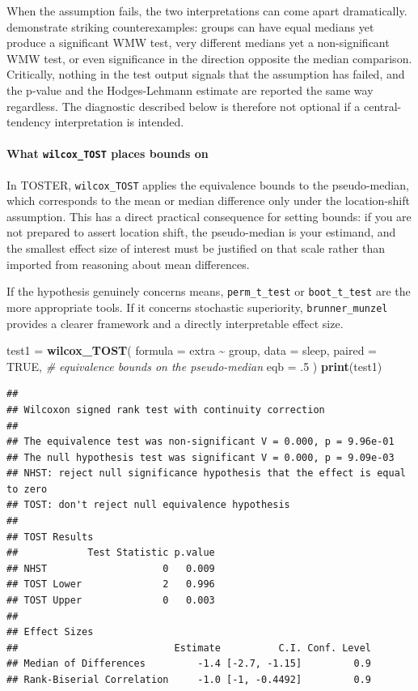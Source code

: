 \documentclass[]{interact}
\theoremstyle{plain}%
\theoremstyle{definition}
\theoremstyle{remark}
\newenvironment{Shaded}{\begin{snugshade}}{\end{snugshade}}
\newcommand{\AttributeTok}[1]{\textcolor[rgb]{0.13,0.29,0.53}{#1}}
\newcommand{\CommentTok}[1]{\textcolor[rgb]{0.56,0.35,0.01}{\textit{#1}}}
\newcommand{\ConstantTok}[1]{\textcolor[rgb]{0.56,0.35,0.01}{#1}}
\newcommand{\DecValTok}[1]{\textcolor[rgb]{0.00,0.00,0.81}{#1}}
\newcommand{\FunctionTok}[1]{\textcolor[rgb]{0.13,0.29,0.53}{\textbf{#1}}}
\newcommand{\NormalTok}[1]{#1}
\newcommand{\OtherTok}[1]{\textcolor[rgb]{0.56,0.35,0.01}{#1}}
\newcommand{\SpecialCharTok}[1]{\textcolor[rgb]{0.81,0.36,0.00}{\textbf{#1}}}
\begin{document}
When the assumption fails, the two interpretations can come apart
dramatically. \citet{median_test} demonstrate striking counterexamples:
groups can have equal medians yet produce a significant WMW test, very
different medians yet a non-significant WMW test, or even significance
in the direction opposite the median comparison. Critically, nothing in
the test output signals that the assumption has failed, and the p-value
and the Hodges-Lehmann estimate are reported the same way regardless.
The diagnostic described below is therefore not optional if a
central-tendency interpretation is intended.

\paragraph{\texorpdfstring{What \texttt{wilcox\_TOST} places bounds
on}{What wilcox\_TOST places bounds on}}\label{what-wilcox_tost-places-bounds-on}

In TOSTER, \texttt{wilcox\_TOST} applies the equivalence bounds to the
pseudo-median, which corresponds to the mean or median difference only
under the location-shift assumption. This has a direct practical
consequence for setting bounds: if you are not prepared to assert
location shift, the pseudo-median is your estimand, and the smallest
effect size of interest must be justified on that scale rather than
imported from reasoning about mean differences.

If the hypothesis genuinely concerns means, \texttt{perm\_t\_test} or
\texttt{boot\_t\_test} are the more appropriate tools. If it concerns
stochastic superiority, \texttt{brunner\_munzel} provides a clearer
framework and a directly interpretable effect size.

\begin{Shaded}
\begin{Highlighting}[]
\NormalTok{test1 }\OtherTok{=} \FunctionTok{wilcox\_TOST}\NormalTok{(}
  \AttributeTok{formula =}\NormalTok{ extra }\SpecialCharTok{\textasciitilde{}}\NormalTok{ group,}
  \AttributeTok{data =}\NormalTok{ sleep,}
  \AttributeTok{paired =} \ConstantTok{TRUE}\NormalTok{,}
  \CommentTok{\# equivalence bounds on the pseudo{-}median}
  \AttributeTok{eqb =}\NormalTok{ .}\DecValTok{5}
\NormalTok{)}
\FunctionTok{print}\NormalTok{(test1)}
\end{Highlighting}
\end{Shaded}

\begin{verbatim}
## 
## Wilcoxon signed rank test with continuity correction
## 
## The equivalence test was non-significant V = 0.000, p = 9.96e-01
## The null hypothesis test was significant V = 0.000, p = 9.09e-03
## NHST: reject null significance hypothesis that the effect is equal to zero 
## TOST: don't reject null equivalence hypothesis
## 
## TOST Results 
##            Test Statistic p.value
## NHST                    0   0.009
## TOST Lower              2   0.996
## TOST Upper              0   0.003
## 
## Effect Sizes 
##                           Estimate          C.I. Conf. Level
## Median of Differences         -1.4 [-2.7, -1.15]         0.9
## Rank-Biserial Correlation     -1.0 [-1, -0.4492]         0.9
\end{verbatim}
\end{document}
